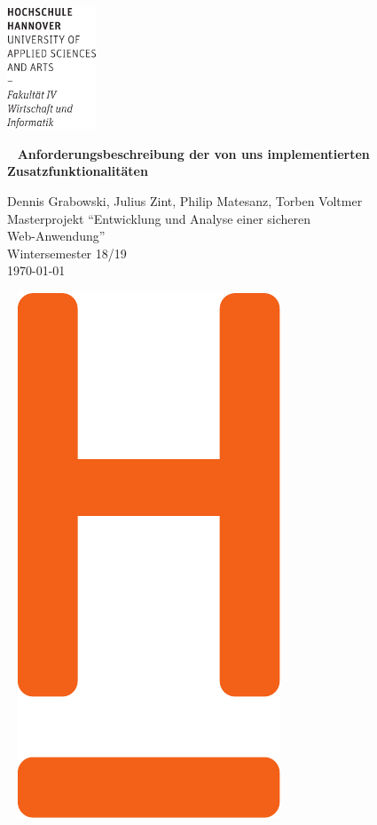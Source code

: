 \documentclass[12pt,DIV14,BCOR10mm,a4paper,parskip=half-,headsepline,headinclude,english,ngerman,bibliography=totocnumbered]{scrreprt}
\begin{document}
  \thispagestyle{empty} %
\includegraphics[width=0.2\textwidth]{Wortmarke_WI_schwarz}

   {  ~ \sffamily
  \vfill
  {\Huge\bfseries Anforderungsbeschreibung der von uns implementierten Zusatzfunktionalitäten}
  \bigskip

  {\Large
  Dennis Grabowski, Julius Zint, Philip Matesanz, Torben Voltmer \\[2ex]
  Masterprojekt \enquote{Entwicklung und Analyse einer sicheren \\Web-Anwendung} \\
  Wintersemester 18/19
 \\[5ex]
   \today }
}
 \vfill

  ~ \hfill
  \includegraphics[height=0.3\paperheight]{H_WI_Pantone1665}
\end{document}
